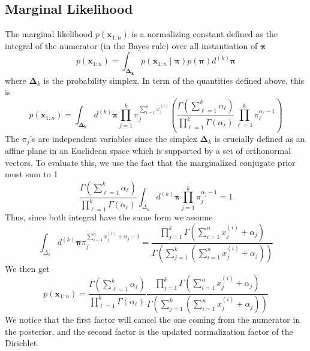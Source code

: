 \documentclass{article}
\newcommand{\s}{\hspace{0.1cm}}
\numberwithin{equation}{section}
\begin{document}
\subsection{Marginal Likelihood}
 The marginal likelihood $p(\mathbf{x}_{1:n})$ 
is a normalizing constant defined as the 
integral of the numerator (in the Bayes rule) over all instantiation of $\bm{ \pi} $
\[
        p(\mathbf{x}_{1:n}) = \int_{\bm{ \Delta_k}} 
        p(\mathbf{x}_{1:n} \mid \bm{ \pi})  p(\bm{ \pi} )d^{(k)}\bm{ \pi}  
\]
where $\bm{ \Delta}_k $ is the probability simplex. In term of the quantities 
defined above, this is
\[
         p(\mathbf{x}_{1:n}) = \int_{\bm{ \Delta_k}} 
         d^{(k)}\bm{ \pi} 
         \prod_{j = 1}^k \pi_j^{\sum_{i =1}^n x_j^{(i)}}
        \left( 
         \frac{\Gamma ( \sum _{\ell = 1}^k \alpha_\ell) }{\prod_{\ell=1}^k \Gamma(\alpha_\ell)} 
         \prod_{\ell = 1}^k \pi_\ell^{\alpha_\ell - 1}
        \right) 
\]
The $\pi_j$'s are independent variables since the simplex $\bm{ \Delta}_k $ is crucially 
defined as an affine plane in an Euclidean space which is supported by 
a set of orthonormal vectors.
To evaluate this, we use the fact that the marginalized conjugate prior must sum to 1
\[
        \frac{\Gamma ( \sum _{\ell = 1}^k \alpha_\ell) }{\prod_{\ell=1}^k \Gamma(\alpha_\ell)} 
        \int_{\Delta_k} d^{(k)}\bm{ \pi} \prod_{j =1}^k \pi_j^{\alpha_j - 1} = 1
\]
Thus, since both integral have the same form we assume
\[
\int_{\Delta_k} d^{(k)}\bm{ \pi}  \pi_j^{\sum_{i = 1}^n x_j^{(i)} + \alpha_j - 1}
        =
        \frac{\prod_{j = 1}^k \Gamma(\sum_{i = 1}^n x_j^{(i)} + \alpha_j)}{
        \Gamma\left(\sum_{j = 1}^k \left( \sum_{i = 1}^n x_j^{(i)} + \alpha_j \right) \right)}
\]
We then get
\[
        \boxed{p(\mathbf{x}_{1:n}) = 
         \frac{\Gamma ( \sum _{\ell = 1}^k \alpha_\ell) }{\prod_{\ell=1}^k \Gamma(\alpha_\ell)} 
        \frac{\prod_{j = 1}^k \Gamma(\sum_{i = 1}^n x_j^{(i)} + \alpha_j)}{
        \Gamma\left(\sum_{j = 1}^k \left( \sum_{i = 1}^n x_j^{(i)} + \alpha_j \right) \right)}
}
\]
We notice that the first factor will cancel the one coming from the numerator in the 
posterior, and the second factor is the updated normalization factor of the Dirichlet.
\end{document}
